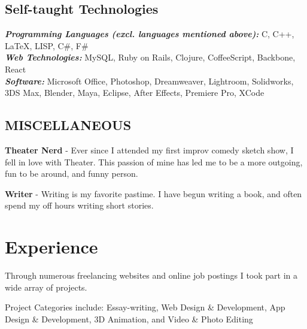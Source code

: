 \documentclass[letterpaper]{deedy-resume} %
\begin{document}
\begin{minipage}[t]{0.66\textwidth}
\begin{tightitemize}
\end{tightitemize}

\subsection{Self-taught Technologies}

{\sl \textbf{Programming Languages (excl. languages mentioned above):}} C, C++, \LaTeX, LISP, C\#, F\# \\
{\sl \textbf{Web Technologies:}} MySQL, Ruby on Rails, Clojure, CoffeeScript, Backbone, React \\
{\sl \textbf{Software:}} Microsoft Office, Photoshop, Dreamweaver, Lightroom, Solidworks, 3DS Max, Blender, Maya, Eclipse, After Effects, Premiere Pro, XCode \\

\subsection{MISCELLANEOUS}

\vspace{\topsep} %

\begin{tightitemize}

	\item \textbf{Theater Nerd} - Ever since I attended my first improv comedy sketch show, I fell in love with Theater. This passion of mine has led me to be a more outgoing, fun to be around, and funny person.
    \item \textbf{Writer} - Writing is my favorite pastime. I have begun writing a book, and often spend my off hours writing short stories.
    
\end{tightitemize}

\sectionspace %


\section{Experience}




\begin{tightitemize}
\item Through numerous freelancing websites and online job postings I took part in a wide array of projects.
\item Project Categories include: Essay-writing, Web Design \& Development, App Design \& Development, 3D Animation, and Video \& Photo Editing
\end{tightitemize}


\end{minipage}
\end{document}
